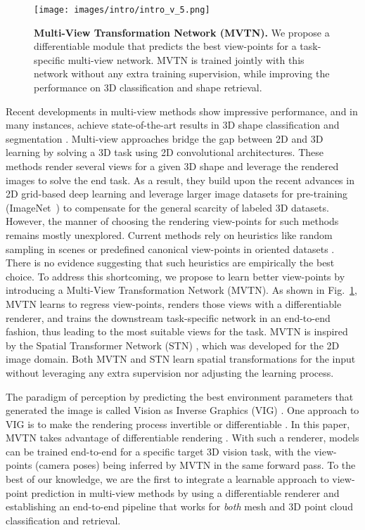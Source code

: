 \documentclass[10pt,twocolumn,letterpaper]{article}
\newcommand{\figLabel}{Fig.~}
\begin{document}
\begin{figure}[t]
    \centering
    \texttt{[image: images/intro/intro\_v\_5.png]}
    \caption{ \small \textbf{Multi-View Transformation Network (MVTN).} We propose a differentiable module that predicts the best view-points for a task-specific multi-view network. MVTN is trained jointly with this network without any extra training supervision, while improving the performance on 3D classification and shape retrieval.}
    \label{fig:pullingFigure}
\end{figure}

Recent developments in multi-view methods show impressive performance, and in many instances, achieve state-of-the-art results in 3D shape classification and segmentation \cite{mvrotationnet,mvviewgcn,mvvirtualsceneseg,mvshapeseg,mvsceneseg}. Multi-view approaches bridge the gap between 2D and 3D learning by solving a 3D task using 2D convolutional architectures. These methods render several views for a given 3D shape and leverage the rendered images to solve the end task. As a result, they build upon the recent advances in 2D grid-based deep learning and leverage larger image datasets for pre-training (\eg ImageNet~\cite{IMAGENET}) to compensate for the general scarcity of labeled 3D datasets.
However, the manner of choosing the rendering view-points for such methods remains mostly unexplored.
Current methods rely on heuristics like random sampling in scenes \cite{mvvirtualsceneseg} or predefined canonical view-points in oriented datasets \cite{mvviewgcn}. There is no evidence suggesting that such heuristics are empirically the best choice. To address this shortcoming, we propose to learn better view-points by introducing a Multi-View Transformation Network (MVTN). 
As shown in \figLabel{\ref{fig:pullingFigure}}, MVTN learns to regress view-points, renders those views with a differentiable renderer, and trains the downstream task-specific network in an end-to-end fashion, thus leading to the most suitable views for the task. 
MVTN is inspired by the Spatial Transformer Network (STN) \cite{stn}, which was developed for the 2D image domain. Both MVTN and STN learn spatial transformations for the input without leveraging any extra supervision nor adjusting the learning process. 

The paradigm of perception by predicting the best environment parameters that generated the image is called  
Vision as Inverse Graphics (VIG) \cite{old-vision1,vig-cinvg,vig-nsd,vig-reinforce,vig-inverse-render-net}.
One approach to VIG is to make the rendering process invertible or differentiable \cite{vig-open-dr,vig-nmr,soft-rasterizer,vig-bid-r,vig-monte-carlo-raytrace}. In this paper, MVTN takes advantage of differentiable rendering \cite{vig-nmr,soft-rasterizer,pytorch3d}. With such a renderer, models can be trained end-to-end for a specific target 3D vision task, with the view-points (\ie camera poses) 
being inferred by MVTN in the same forward pass.
To the best of our knowledge, we are the first to integrate a learnable approach to view-point prediction in multi-view methods by using a differentiable renderer and establishing an end-to-end pipeline that works for \textit{both} mesh and 3D point cloud classification and retrieval. 
\end{document}
